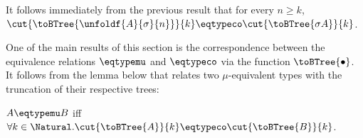 \begin{remark}
\label{rem:cutFiniteUnfolding}
It follows immediately from the previous result that for every $n \geq k$,
$\cut{\toBTree{\unfoldf{A}{\sigma}{n}}}{k} \eqtypeco
\cut{\toBTree{\sigma A}}{k}$.
\end{remark}



One of the main results of this section is the correspondence between the
equivalence relations $\eqtypemu$ and $\eqtypeco$ via the function
$\toBTree{\bullet}$. It follows from the lemma below that relates two
$\mu$-equivalent types with the truncation of their respective trees:

\begin{lemma}
\label{lem:cutEquivalenceMu}
$A \eqtypemu B$ iff $\forall k \in \Natural.\cut{\toBTree{A}}{k} \eqtypeco
\cut{\toBTree{B}}{k}$.
\end{lemma}

